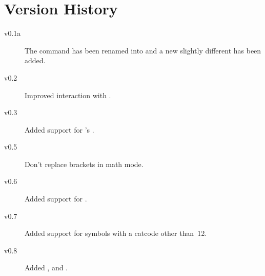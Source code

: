 \documentclass[load-preamble+]{cnltx-doc}
\begin{document}
\section{Version History}
\begin{description}
  \item[v0.1a] The command  has been renamed into
     and a new slightly different  has been added.
  \item[v0.2] Improved interaction with .
  \item[v0.3] Added support for 's .
  \item[v0.5] Don't replace brackets in math mode.
  \item[v0.6] Added support for .
  \item[v0.7] Added support for symbols with a catcode other than~12.
  \item[v0.8] Added ,  and .
\end{description}
\end{document}
